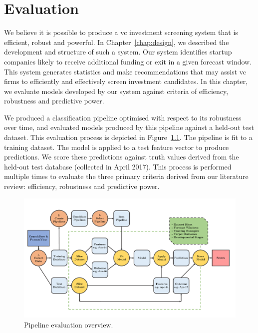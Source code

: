 \documentclass[../thesis/thesis.tex]{subfiles}
\begin{document}
\chapter{Evaluation}
\label{chap:evaluation}

We believe it is possible to produce a \gls{vc} investment screening system that is efficient, robust and powerful. In Chapter~\ref{chap:design}, we described the development and structure of such a system. Our system identifies startup companies likely to receive additional funding or exit in a given forecast window. This system generates statistics and make recommendations that may assist \gls{vc} firms to efficiently and effectively screen investment candidates. In this chapter, we evaluate models developed by our system against criteria of efficiency, robustness and predictive power.

We produced a classification pipeline optimised with respect to its robustness over time, and evaluated models produced by this pipeline against a held-out test dataset. This evaluation process is depicted in Figure~\ref{fig:evaluation:pipeline_evaluation}. The pipeline is fit to a training dataset. The model is applied to a test feature vector to produce predictions. We score these predictions against truth values derived from the held-out test database (collected in April 2017). This process is performed multiple times to evaluate the three primary criteria derived from our literature review: efficiency, robustness and predictive power.

\begin{figure}[!htb]
    \centering
    \includegraphics[width=\textwidth]{../figures/evaluation/flowchart_evaluation}
    \caption[Pipeline evaluation flowchart]{Pipeline evaluation overview.}
    \label{fig:evaluation:pipeline_evaluation}
\end{figure}
\end{document}
